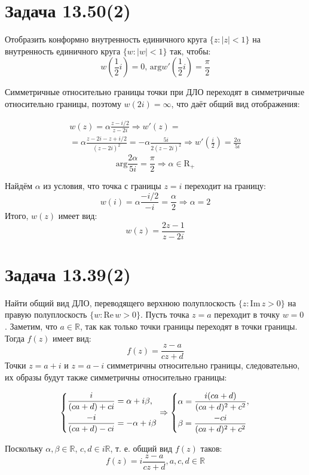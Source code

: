 \documentclass[11pt]{article}
\begin{document}
\section{Задача 13.50(2)}
\label{sec:orgeb48486}
Отобразить конформно внутренность единичного круга \(\{z: |z| < 1\}\) на внутренность единичного круга \(\{w: |w| < 1\}\)
так, чтобы:
$$w\left(\frac{1}2i\right) = 0, \,\mathrm{arg} w'\left(\frac{1}2i\right) = \frac{\pi}2$$

Симметричные относительно границы точки при ДЛО переходят в симметричные относительно границы, поэтому \(w(2i) = \infty\),
что даёт общий вид отображения:
\begin{Latex}
\begin{multline*}
w(z) = \alpha\frac{z - i/2}{z - 2i} \Rightarrow w'(z) = \\
= \alpha\frac{z - 2i - z + i/2}{(z - 2i)^2} = -\alpha\frac{5i}{2(z - 2i)^2} \Rightarrow w'\left(\frac{i}2\right) = \frac{2\alpha}{5i}
\end{multline*}
$$\mathrm{arg}\frac{2\alpha}{5i} = \frac{\pi}2 \Rightarrow \alpha \in \mathrm{R}_+$$
\end{Latex}
Найдём \(\alpha\) из условия, что точка с границы \(z = i\) переходит на границу:
$$w(i) = \alpha\frac{-i/2}{-i} = \frac{\alpha}2 \Rightarrow \alpha = 2$$
Итого, \(w(z)\) имеет вид:
$$w(z) = \frac{2z - 1}{z - 2i}$$
\section{Задача 13.39(2)}
\label{sec:org84e8fd8}
Найти общий вид ДЛО, переводящего верхнюю полуплоскость \(\{z: \mathrm{Im}\,z > 0\}\) на правую полуплоскость
\(\{w: \mathrm{Re}\,w > 0\}\).
Пусть точка \(z = a\) переходит в точку \(w = 0\). Заметим, что \(a \in \mathbb{R}\), так как только точки границы
переходят в точки границы. Тогда \(f(z)\) имеет вид:
$$f(z) = \frac{z - a}{cz + d}$$
Точки \(z = a + i\) и \(z = a - i\) симметричны относительно границы, следовательно, их образы будут также симметричны
относительно границы:
\begin{latex}
\begin{multline*}
\begin{dcases}
\frac{i}{(ca + d) + ci} = \alpha + i\beta, \\
\frac{-i}{(ca + d) - ci} = -\alpha + i\beta
\end{dcases}
\Rightarrow
\begin{dcases}
\alpha = \frac{i(ca +d)}{(ca + d)^2 + c^2}, \\
\beta = \frac{-ci}{(ca + d)^2 + c^2}
\end{dcases}
\end{multline*}
\end{latex}
Поскольку \(\alpha, \beta \in \mathbb{R}\), \(c, d \in i\mathbb{R}\), т. е. общий вид \(f(z)\) таков:
$$f(z) = i\frac{z - a}{cz + d}, a, c, d \in \mathbb{R}$$
\end{document}
